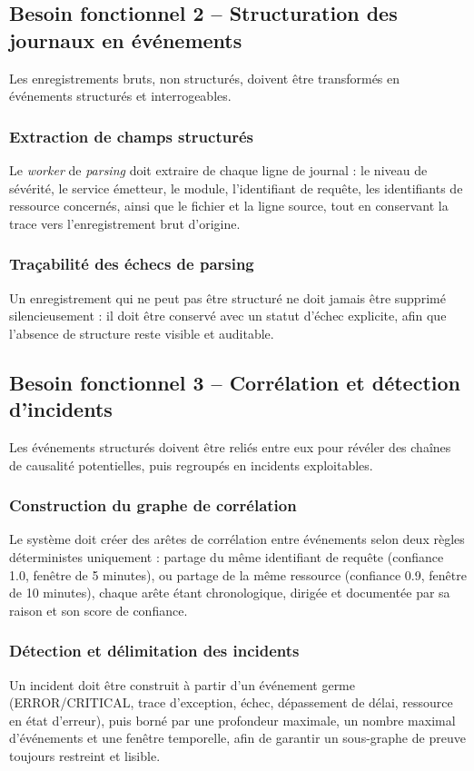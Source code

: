 \documentclass[a4paper,11pt,oneside]{report}
\begin{document}
\subsection{Besoin fonctionnel 2 -- Structuration des journaux en événements}
Les enregistrements bruts, non structurés, doivent être transformés en événements structurés et interrogeables.
\subsubsection{Extraction de champs structurés}
Le \emph{worker} de \emph{parsing} doit extraire de chaque ligne de journal : le niveau de sévérité, le service émetteur, le module, l'identifiant de requête, les identifiants de ressource concernés, ainsi que le fichier et la ligne source, tout en conservant la trace vers l'enregistrement brut d'origine.
\subsubsection{Traçabilité des échecs de parsing}
Un enregistrement qui ne peut pas être structuré ne doit jamais être supprimé silencieusement : il doit être conservé avec un statut d'échec explicite, afin que l'absence de structure reste visible et auditable.

\subsection{Besoin fonctionnel 3 -- Corrélation et détection d'incidents}
Les événements structurés doivent être reliés entre eux pour révéler des chaînes de causalité potentielles, puis regroupés en incidents exploitables.
\subsubsection{Construction du graphe de corrélation}
Le système doit créer des arêtes de corrélation entre événements selon deux règles déterministes uniquement : partage du même identifiant de requête (confiance 1.0, fenêtre de 5 minutes), ou partage de la même ressource (confiance 0.9, fenêtre de 10 minutes), chaque arête étant chronologique, dirigée et documentée par sa raison et son score de confiance.
\subsubsection{Détection et délimitation des incidents}
Un incident doit être construit à partir d'un événement germe (ERROR/CRITICAL, trace d'exception, échec, dépassement de délai, ressource en état d'erreur), puis borné par une profondeur maximale, un nombre maximal d'événements et une fenêtre temporelle, afin de garantir un sous-graphe de preuve toujours restreint et lisible.
\end{document}
